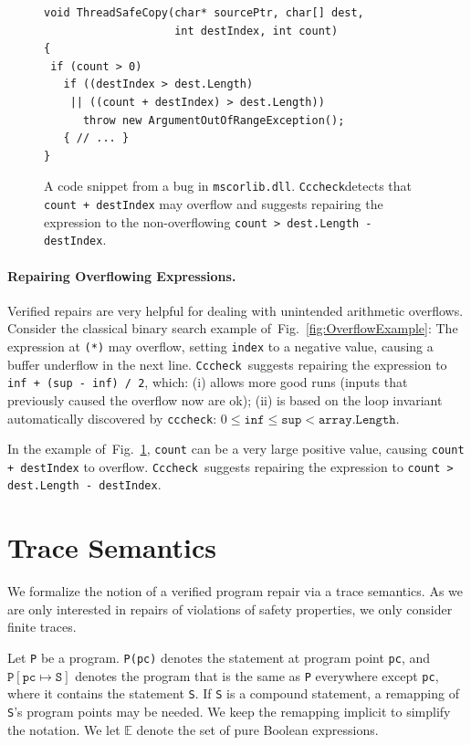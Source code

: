 \documentclass[10pt]{sigplanconf}
\newcommand{\labelFig}[1]{\label{fig:#1}}
\newcommand{\refFig}[1]{Fig.~\ref{fig:#1}}
\newcommand{\code}[1]{\texttt{#1}}
\newcommand{\clousot}{\code{cccheck}}
\newcommand{\Clousot}{\code{Cccheck}}
\begin{document}
\begin{figure}[t]
\begin{lstlisting}
void ThreadSafeCopy(char* sourcePtr, char[] dest, 
                    int destIndex, int count)
{
 if (count > 0)
   if ((destIndex > dest.Length) 
    || ((count + destIndex) > dest.Length))
      throw new ArgumentOutOfRangeException();
   { // ... } 
}
\end{lstlisting}
\caption{A code snippet from a bug in \code{mscorlib.dll}. 
\Clousot detects that \code{count + destIndex} may overflow and suggests repairing
the expression to the non-overflowing \code{count > dest.Length - destIndex}.}
\labelFig{OverflowExample2}
\end{figure}

\paragraph{Repairing Overflowing Expressions.}
Verified repairs are very helpful for dealing with unintended
arithmetic overflows.  Consider the classical binary search example
of~\refFig{OverflowExample}: The expression at \code{(*)} may
overflow, setting \code{index} to a negative value, causing a buffer
underflow in the next line.
\Clousot\ suggests repairing the expression to \code{inf + (sup - inf) / 2},
which: (i) allows more good runs (inputs that previously caused
the overflow now are ok); (ii) is based on the loop invariant
automatically discovered by \clousot: $0 \leq
\code{inf} \leq \code {sup} < \code{array.Length}$.  

In the example of~\refFig{OverflowExample2}, \code{count} can be a
very large positive value, causing \code{count + destIndex} to
overflow. \Clousot\ suggests repairing the expression to \code{count >
dest.Length - destIndex}.

\section{Trace Semantics}
\label{sec:tracesemantics}

We formalize the notion of a verified program repair via a trace
semantics.  As we are only interested in repairs of violations of
safety properties, we only consider finite traces.

Let \code{P} be a program.
\code{P(pc)} denotes the statement at program point \code{pc}, and $\code{P}[\code{pc} \mapsto \code{S}]$ denotes 
the program that is the same as \code{P} everywhere except \code{pc}, where it contains the statement \code{S}.
If \code{S} is a compound statement, a remapping of \code{S}'s program points may be needed.
We keep the remapping implicit to simplify the notation.
We let $\mathbb{E}$ denote the set of  pure Boolean expressions.  
\end{document}
